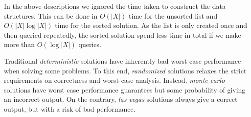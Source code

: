 \begin{leftbar}
    In the above descriptions we ignored the time taken to construct the data structures. This can be done in $O(|X|)$ time for the unsorted list and $O(|X| \log |X|)$ time for the sorted solution. As the list is only created once and then queried repeatedly, the sorted solution spend less time in total if we make more than $O(\log |X|)$ queries.
    
    
    
    
    
\end{leftbar}

Traditional \emph{deterministic} solutions have inherently bad worst-case performance when solving some problems. To this end, \emph{randomized} solutions relaxes the strict requirements on correctness and worst-case analysis. Instead, \emph{monte carlo} solutions have worst case performance guarantees but some probability of giving an incorrect output. On the contrary, \emph{las vegas} solutions always give a correct output, but with a risk of bad performance.

